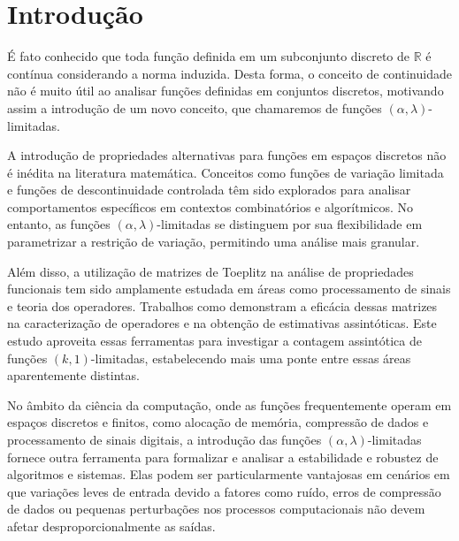 \section*{Introdução}

\vspace{1cm}
\normalsize

É fato conhecido que toda função definida em um subconjunto discreto de $\mathbb{R}$ é contínua considerando a norma induzida. Desta forma, o conceito de continuidade não é muito útil ao analisar funções definidas em conjuntos discretos, motivando assim a introdução de um novo conceito, que chamaremos de funções $(\alpha,\lambda)$-limitadas.

A introdução de propriedades alternativas para funções em espaços discretos não é inédita na literatura matemática. Conceitos como funções de variação limitada e funções de descontinuidade controlada têm sido explorados para analisar comportamentos específicos em contextos combinatórios e algorítmicos. No entanto, as funções $(\alpha,\lambda)$-limitadas se distinguem por sua flexibilidade em parametrizar a restrição de variação, permitindo uma análise mais granular.

Além disso, a utilização de matrizes de Toeplitz na análise de propriedades funcionais tem sido amplamente estudada em áreas como processamento de sinais e teoria dos operadores. Trabalhos como \cite{bottcher} demonstram a eficácia dessas matrizes na caracterização de operadores e na obtenção de estimativas assintóticas. Este estudo aproveita essas ferramentas para investigar a contagem assintótica de funções $(k,1)$-limitadas, estabelecendo mais uma ponte entre essas áreas aparentemente distintas.

No âmbito da ciência da computação, onde as funções frequentemente operam em espaços discretos e finitos, como alocação de memória, compressão de dados e processamento de sinais digitais, a introdução das funções $(\alpha,\lambda)$-limitadas fornece outra ferramenta para formalizar e analisar a estabilidade e robustez de algoritmos e sistemas. Elas podem ser particularmente vantajosas em cenários em que variações leves de entrada devido a fatores como ruído, erros de compressão de dados ou pequenas perturbações nos processos computacionais não devem afetar desproporcionalmente as saídas.

